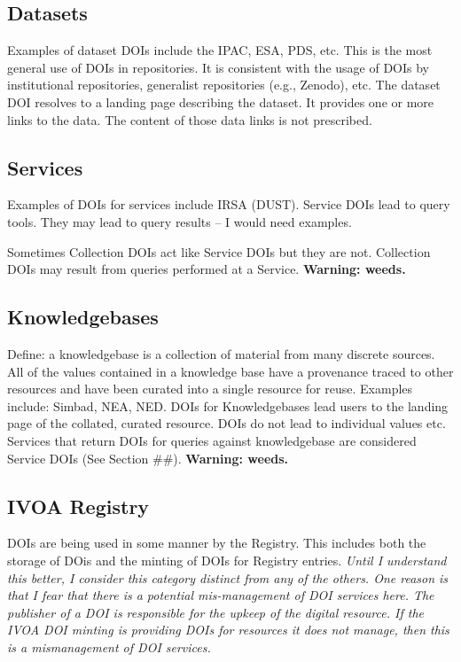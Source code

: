 \documentclass[11pt,a4paper]{ivoa}
\begin{document}
\subsection{Datasets}
Examples of dataset DOIs include the IPAC, ESA, PDS, etc. 
This is the most general use of DOIs in repositories.
It is consistent with the usage of DOIs by institutional repositories, generalist repositories (e.g., Zenodo), etc.
The dataset DOI resolves to a landing page describing the dataset.
It provides one or more links to the data.
The content of those data links is not prescribed. 

\subsection{Services}
Examples of DOIs for services include IRSA (DUST).
Service DOIs lead to query tools.
They may lead to query results -- I would need examples.

Sometimes Collection DOIs act like Service DOIs but they are not.
Collection DOIs may result from queries performed at a Service.
\textbf{Warning: weeds.}

\subsection{Knowledgebases}

Define: a knowledgebase is a collection of material from many discrete sources.
All of the values contained in a knowledge base have a provenance traced to other resources
and have been curated into a single resource for reuse.
Examples include: Simbad, NEA, NED. 
DOIs for Knowledgebases lead users to the landing page of the collated, curated resource. 
DOIs do not lead to individual values etc. 
Services that return DOIs for queries against knowledgebase are considered Service DOIs (See Section \#\#).
\textbf{Warning: weeds.}

\subsection{IVOA Registry}
DOIs are being used in some manner by the Registry.
This includes both the storage of DOis and
the minting of DOIs for Registry entries.
\textit{Until I understand this better, I consider this category distinct from any of the others. 
One reason is that I fear that there is a potential mis-management of DOI services here.
The publisher of a DOI is responsible for the upkeep of the digital resource.
If the IVOA DOI minting is providing DOIs for resources it does not manage, then this is a mismanagement of DOI services.}
\end{document}

